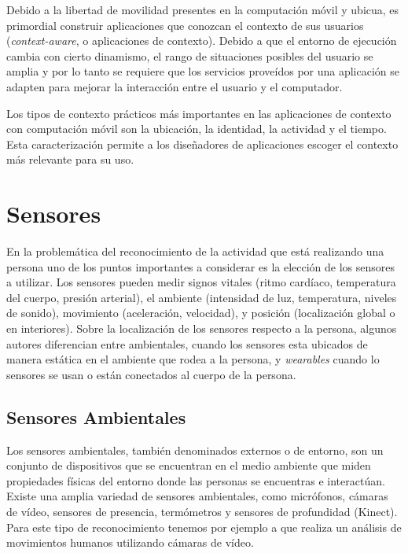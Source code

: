 Debido a la libertad de movilidad presentes en la computación móvil
y ubicua, es primordial construir aplicaciones que conozcan el contexto
de sus usuarios (\emph{context-aware}, o aplicaciones de contexto).
Debido a que el entorno de ejecución cambia con cierto dinamismo,
el rango de situaciones posibles del usuario se amplia y por lo tanto
se requiere que los servicios proveídos por una aplicación se adapten
para mejorar la interacción entre el usuario y el computador. 

Los tipos de contexto prácticos más importantes en las aplicaciones
de contexto con computación móvil son la ubicación, la identidad,
la actividad y el tiempo. Esta caracterización permite a los diseñadores
de aplicaciones escoger el contexto más relevante para su uso.

\section{Sensores}

\label{sec23:sensores} En la problemática del reconocimiento de la
actividad que está realizando una persona uno de los puntos importantes
a considerar es la elección de los sensores a utilizar. Los sensores
pueden medir signos vitales (ritmo cardíaco, temperatura del cuerpo,
presión arterial), el ambiente (intensidad de luz, temperatura, niveles
de sonido), movimiento (aceleración, velocidad), y posición (localización
global o en interiores). Sobre la localización de los sensores respecto
a la persona, algunos autores \cite{ReyesOrtiz2015} diferencian entre
ambientales, cuando los sensores esta ubicados de manera estática
en el ambiente que rodea a la persona, y \emph{wearables} cuando lo
sensores se usan o están conectados al cuerpo de la persona.

\subsection{Sensores Ambientales}

Los sensores ambientales, también denominados externos o de entorno,
son un conjunto de dispositivos que se encuentran en el medio ambiente
que miden propiedades físicas del entorno donde las personas se encuentras
e interactúan. Existe una amplia variedad de sensores ambientales,
como micrófonos, cámaras de vídeo, sensores de presencia, termómetros
y sensores de profundidad (Kinect). Para este tipo de reconocimiento
tenemos por ejemplo a \cite{Poppe2007} que realiza un análisis de
movimientos humanos utilizando cámaras de vídeo.

